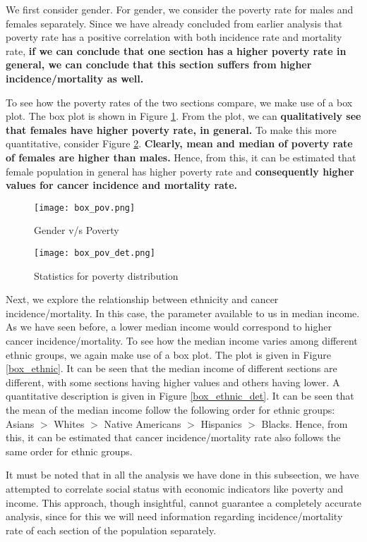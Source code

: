 \documentclass[conference]{IEEEtran}
\begin{document}
We first consider gender. For gender, we consider the poverty rate for males and females separately. Since we have already concluded from earlier analysis that poverty rate has a positive correlation with both incidence rate and mortality rate, \textbf{if we can conclude that one section has a higher poverty rate in general, we can conclude that this section suffers from higher incidence/mortality as well.} 

To see how the poverty rates of the two sections compare, we make use of a box plot. The box plot is shown in Figure \ref{gend_box}. From the plot, we can \textbf{qualitatively see that females have higher poverty rate, in general.} To make this more quantitative, consider Figure \ref{box_pov_det}. \textbf{Clearly, mean and median of poverty rate of females are higher than males.} Hence, from this, it can be estimated that female population in general has higher poverty rate and \textbf{consequently higher values for cancer incidence and mortality rate.}

\begin{figure}[tbh]
\centering
\texttt{[image: box\_pov.png]}
\caption{Gender v/s Poverty}
\label{gend_box}
\end{figure}

\begin{figure}[tbh]
\centering
\texttt{[image: box\_pov\_det.png]}
\caption{Statistics for poverty distribution}
\label{box_pov_det}
\end{figure}


Next, we explore the relationship between ethnicity and cancer incidence/mortality. In this case, the parameter available to us in median income. As we have seen before, a lower median income would correspond to higher cancer incidence/mortality. To see how the median income varies among different ethnic groups, we again make use of a box plot. The plot is given in Figure \ref{box_ethnic}. It can be seen that the median income of different sections are different, with some sections having higher values and others having lower. A quantitative description is given in Figure \ref{box_ethnic_det}. It can be seen that the mean of the median income follow the following order for ethnic groups:
Asians $>$ Whites $>$ Native Americans $>$ Hispanics $>$ Blacks. Hence, from this, it can be estimated that cancer incidence/mortality rate also follows the same order for ethnic groups.



It must be noted that in all the analysis we have done in this subsection, we have attempted to correlate social status with economic indicators like poverty and income. This approach, though insightful, cannot guarantee a completely accurate analysis, since for this we will need information regarding incidence/mortality rate of each section of the population separately. 
\end{document}
